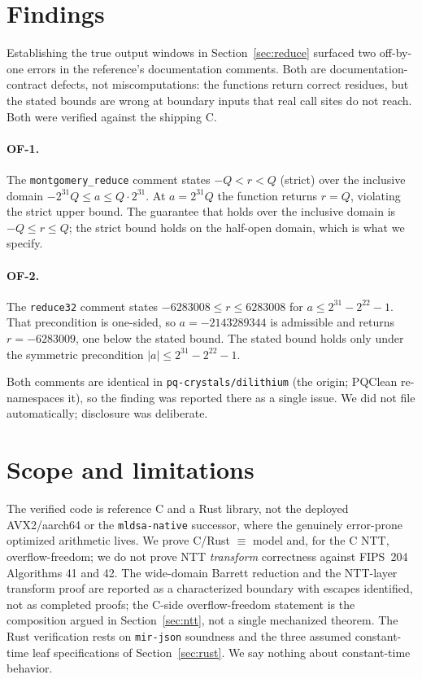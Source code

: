 \documentclass[11pt]{article}
\newcommand{\code}[1]{\texttt{#1}}
\begin{document}
\section{Findings}\label{sec:findings}

Establishing the true output windows in Section~\ref{sec:reduce} surfaced two off-by-one errors in the
reference's documentation comments. Both are documentation-contract defects, not miscomputations: the
functions return correct residues, but the stated bounds are wrong at boundary inputs that real call
sites do not reach. Both were verified against the shipping C.

\paragraph{OF-1.} The \code{montgomery\_reduce} comment states $-Q < r < Q$ (strict) over the inclusive
domain $-2^{31} Q \le a \le Q \cdot 2^{31}$. At $a = 2^{31} Q$ the function returns $r = Q$, violating the
strict upper bound. The guarantee that holds over the inclusive domain is $-Q \le r \le Q$; the strict
bound holds on the half-open domain, which is what we specify.

\paragraph{OF-2.} The \code{reduce32} comment states $-6283008 \le r \le 6283008$ for $a \le 2^{31} -
2^{22} - 1$. That precondition is one-sided, so $a = -2143289344$ is admissible and returns $r =
-6283009$, one below the stated bound. The stated bound holds only under the symmetric precondition
$|a| \le 2^{31} - 2^{22} - 1$.

Both comments are identical in \code{pq-crystals/dilithium} (the origin; PQClean re-namespaces it), so
the finding was reported there as a single issue. We did not file automatically; disclosure was
deliberate.

\section{Scope and limitations}\label{sec:scope}

The verified code is reference C and a Rust library, not the deployed AVX2/aarch64 or the
\code{mldsa-native} successor, where the genuinely error-prone optimized arithmetic lives. We prove
C/Rust $\equiv$ model and, for the C NTT, overflow-freedom; we do not prove NTT \emph{transform}
correctness against FIPS~204 Algorithms 41 and 42. The wide-domain Barrett reduction and the NTT-layer
transform proof are reported as a characterized boundary with escapes identified, not as completed
proofs; the C-side overflow-freedom statement is the composition argued in Section~\ref{sec:ntt}, not a
single mechanized theorem. The Rust verification rests on \code{mir-json} soundness and the three assumed
constant-time leaf specifications of Section~\ref{sec:rust}. We say nothing about constant-time behavior.
\end{document}
